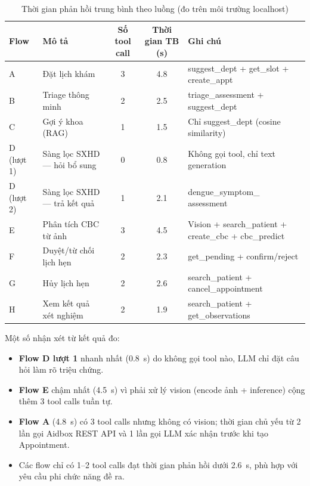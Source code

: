 \documentclass[a4paper,13pt,3p,twoside,openany]{report}
\theoremstyle{definition}
\theoremstyle{remark}
\theoremstyle{definition}
\begin{document}
\begin{table}[H]
\centering
\small
\begin{tabular}{|l|p{3.2cm}|c|c|p{4.8cm}|}
\hline
\textbf{Flow} & \textbf{Mô tả} & \textbf{Số tool call} & \textbf{Thời gian TB (s)} & \textbf{Ghi chú} \\
\hline
A & Đặt lịch khám & 3 & 4.8 & suggest\_dept + get\_slot + create\_appt \\
\hline
B & Triage thông minh & 2 & 2.5 & triage\_assessment + suggest\_dept \\
\hline
C & Gợi ý khoa (RAG) & 1 & 1.5 & Chỉ suggest\_dept (cosine similarity) \\
\hline
D (lượt 1) & Sàng lọc SXHD --- hỏi bổ sung & 0 & 0.8 & Không gọi tool, chỉ text generation \\
\hline
D (lượt 2) & Sàng lọc SXHD --- trả kết quả & 1 & 2.1 & dengue\_symptom\_ assessment \\
\hline
E & Phân tích CBC từ ảnh & 3 & 4.5 & Vision + search\_patient \newline + create\_cbc + cbc\_predict \\
\hline
F & Duyệt/từ chối lịch hẹn & 2 & 2.3 & get\_pending + confirm/reject \\
\hline
G & Hủy lịch hẹn & 2 & 2.6 & search\_patient \newline + cancel\_appointment \\
\hline
H & Xem kết quả xét nghiệm & 2 & 1.9 & search\_patient + get\_observations \\
\hline
\end{tabular}
\caption{Thời gian phản hồi trung bình theo luồng (đo trên môi trường localhost)}
\label{tab:perf}
\end{table}

Một số nhận xét từ kết quả đo:
\begin{itemize}
  \item \textbf{Flow D lượt 1} nhanh nhất (0.8~s) do không gọi tool nào, LLM chỉ đặt câu hỏi làm rõ triệu chứng.
  \item \textbf{Flow E} chậm nhất (4.5~s) vì phải xử lý vision (encode ảnh + inference) cộng thêm 3 tool calls tuần tự.
  \item \textbf{Flow A} (4.8~s) có 3 tool calls nhưng không có vision; thời gian chủ yếu từ 2 lần gọi Aidbox REST API và 1 lần gọi LLM xác nhận trước khi tạo Appointment.
  \item Các flow chỉ có 1--2 tool calls đạt thời gian phản hồi dưới 2.6~s, phù hợp với yêu cầu phi chức năng đề ra.
\end{itemize}
\end{document}
